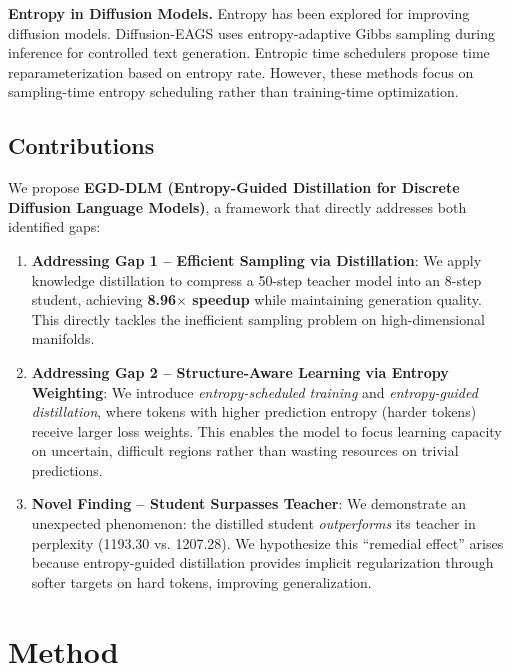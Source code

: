 \documentclass[conference]{IEEEtran}
\begin{document}
\textbf{Entropy in Diffusion Models.} Entropy has been explored for improving diffusion models. Diffusion-EAGS \cite{han2024diffusion} uses entropy-adaptive Gibbs sampling during inference for controlled text generation. Entropic time schedulers \cite{liu2025entropic} propose time reparameterization based on entropy rate. However, these methods focus on sampling-time entropy scheduling rather than training-time optimization.

\subsection{Contributions}

We propose \textbf{EGD-DLM (Entropy-Guided Distillation for Discrete Diffusion Language Models)}, a framework that directly addresses both identified gaps:

\begin{enumerate}
    \item \textbf{Addressing Gap 1 -- Efficient Sampling via Distillation}: We apply knowledge distillation to compress a 50-step teacher model into an 8-step student, achieving \textbf{8.96$\times$ speedup} while maintaining generation quality. This directly tackles the inefficient sampling problem on high-dimensional manifolds.

    \item \textbf{Addressing Gap 2 -- Structure-Aware Learning via Entropy Weighting}: We introduce \textit{entropy-scheduled training} and \textit{entropy-guided distillation}, where tokens with higher prediction entropy (harder tokens) receive larger loss weights. This enables the model to focus learning capacity on uncertain, difficult regions rather than wasting resources on trivial predictions.

    \item \textbf{Novel Finding -- Student Surpasses Teacher}: We demonstrate an unexpected phenomenon: the distilled student \textit{outperforms} its teacher in perplexity (1193.30 vs. 1207.28). We hypothesize this ``remedial effect'' arises because entropy-guided distillation provides implicit regularization through softer targets on hard tokens, improving generalization.
\end{enumerate}

\section{Method}
\label{sec:method}
\end{document}
